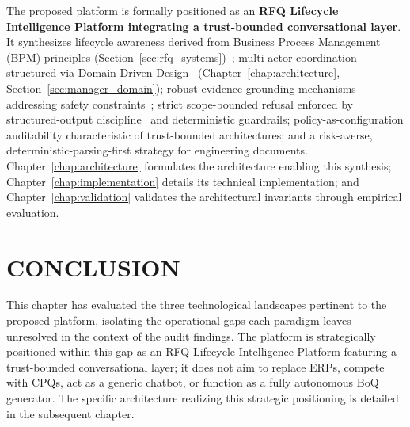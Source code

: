 The proposed platform is formally positioned as an \textbf{RFQ Lifecycle Intelligence Platform integrating a trust-bounded conversational layer}. It synthesizes lifecycle awareness derived from Business Process Management (BPM) principles (Section~\ref{sec:rfq_systems})~\cite{dumas2018bpm}; multi-actor coordination structured via Domain-Driven Design~\cite{evans2003ddd} (Chapter~\ref{chap:architecture}, Section~\ref{sec:manager_domain}); robust evidence grounding mechanisms addressing safety constraints~\cite{ji2023hallucination, bai2022constitutional, zheng2023judge}; strict scope-bounded refusal enforced by structured-output discipline~\cite{anthropic_structured_outputs_docs} and deterministic guardrails; policy-as-configuration auditability characteristic of trust-bounded architectures; and a risk-averse, deterministic-parsing-first strategy for engineering documents. Chapter~\ref{chap:architecture} formulates the architecture enabling this synthesis; Chapter~\ref{chap:implementation} details its technical implementation; and Chapter~\ref{chap:validation} validates the architectural invariants through empirical evaluation.

\section*{CONCLUSION}
This chapter has evaluated the three technological landscapes pertinent to the proposed platform, isolating the operational gaps each paradigm leaves unresolved in the context of the audit findings. The platform is strategically positioned within this gap as an RFQ Lifecycle Intelligence Platform featuring a trust-bounded conversational layer; it does not aim to replace ERPs, compete with CPQs, act as a generic chatbot, or function as a fully autonomous BoQ generator. The specific architecture realizing this strategic positioning is detailed in the subsequent chapter.
